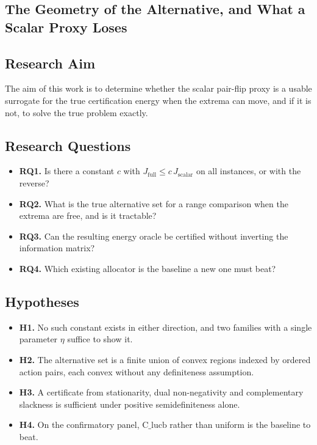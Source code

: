 \documentclass[conference]{IEEEtran}
\theoremstyle{definition}
\begin{document}
\subsection{The Geometry of the Alternative, and What a Scalar Proxy Loses}

\subsection{Research Aim}

The aim of this work is to determine whether the scalar pair-flip proxy is a usable surrogate
for the true certification energy when the extrema can move, and if it is not, to solve the
true problem exactly.

\subsection{Research Questions}

\begin{itemize}
\item \textbf{RQ1.} Is there a constant $c$ with $J_{\mathrm{full}}\le c\,J_{\mathrm{scalar}}$
on all instances, or with the reverse?
\item \textbf{RQ2.} What is the true alternative set for a range comparison when the extrema
are free, and is it tractable?
\item \textbf{RQ3.} Can the resulting energy oracle be certified without inverting the
information matrix?
\item \textbf{RQ4.} Which existing allocator is the baseline a new one must beat?
\end{itemize}

\subsection{Hypotheses}

\begin{itemize}
\item \textbf{H1.} No such constant exists in either direction, and two families with a single
parameter $\eta$ suffice to show it.
\item \textbf{H2.} The alternative set is a finite union of convex regions indexed by ordered
action pairs, each convex without any definiteness assumption.
\item \textbf{H3.} A certificate from stationarity, dual non-negativity and complementary
slackness is sufficient under positive semidefiniteness alone.
\item \textbf{H4.} On the confirmatory panel, $\mathrm{C\_lucb}$ rather than uniform is the
baseline to beat.
\end{itemize}
\end{document}

